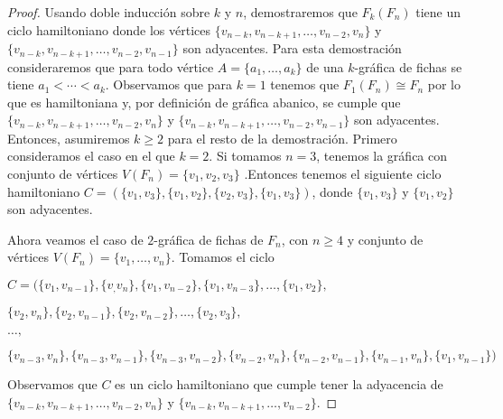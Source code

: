         
        \begin{proof}
            Usando doble inducci\'on sobre $k$ y $n$, demostraremos que
            $F_k(F_n)$ tiene un ciclo hamiltoniano donde los v\'ertices
            $\{v_{n-k}, v_{n-k+1}, \dots, v_{n-2}, v_n\}$ y $\{v_{n-k},
            v_{n-k+1}, \dots, v_{n-2}, v_{n-1}\}$ son adyacentes. Para esta
            demostraci\'on consideraremos que para todo v\'ertice $A = \{a_1,
            \dots, a_k\}$ de una $k$-gr\'afica de fichas se tiene $a_1 < \cdots
            < a_k$. Observamos que para $k =1$ tenemos que $F_1(F_n) \cong F_n$
            por lo que es hamiltoniana y, por definici\'on de gr\'afica abanico,
            se cumple que $\{v_{n-k}, v_{n-k+1}, \dots, v_{n-2}, v_n\}$ y
            $\{v_{n-k}, v_{n-k+1}, \dots, v_{n-2}, v_{n-1}\}$ son adyacentes.
            Entonces, asumiremos $k \geq 2$ para el resto de la demostraci\'on.
            Primero consideramos el caso en el que $k =2$. Si tomamos $n = 3$,
            tenemos la gr\'afica con conjunto de v\'ertices $V(F_n)=\{v_1, v_2,
            v_3\}$ .Entonces tenemos el siguiente ciclo hamiltoniano $C=
            (\{v_1,v_3\},\{v_1,v_2\},\{v_2,v_3\}, \{v_1,v_3\})$, donde $\{v_1,
            v_3\}$ y $\{v_1, v_2\}$ son adyacentes. 
            
            Ahora veamos el caso de $2$-gr\'afica de fichas de $F_n$, con $n
            \geq 4$ y conjunto de v\'ertices $V(F_n)=\{v_1,\dots, v_n\}$.
            Tomamos el ciclo
    
            $C = (\{v_1, v_{n-1}\},\{v_, v_n\},\{v_1, v_{n-2}\}, \{v_1,
            v_{n-3}\}, \dots, \{v_1, v_2\},$
            
            $\{v_2, v_n\}, \{v_2, v_{n-1}\}, \{v_2, v_{n-2}\},
            \dots, \{v_2, v_3\},$
    
            $ \dots,$
    
            $\{v_{n-3},v_n\}, \{v_{n-3}, v_{n-1}\},\{v_{n-3},v_{n-2}\},
            \{v_{n-2}, v_n\},\{v_{n-2}, v_{n-1}\}, \{v_{n-1}, v_n\}, \{v_1,
            v_{n-1}\})$
    
            Observamos que $C$ es un ciclo hamiltoniano que cumple tener la
            adyacencia de  $\{v_{n-k}, v_{n-k+1}, \dots, v_{n-2}, v_n\}$ y
            $\{v_{n-k}, v_{n-k+1}, \dots, v_{n-2}\}$. 
    

\end{proof}
